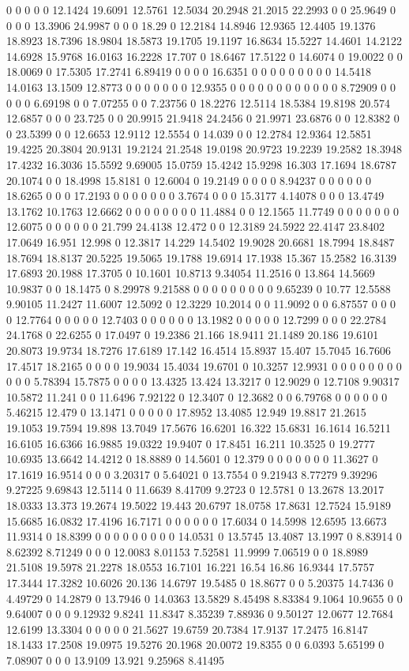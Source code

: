 0 0 0 0 0 12.1424 19.6091 12.5761 12.5034 20.2948 21.2015 22.2993 0 0 25.9649 0 0 0 0 13.3906 24.9987 0 0 0 18.29 0 12.2184 14.8946 12.9365 12.4405 19.1376 18.8923 18.7396 18.9804 18.5873 19.1705 19.1197 16.8634 15.5227 14.4601 14.2122 14.6928 15.9768 16.0163 16.2228 17.707 0 18.6467 17.5122 0 14.6074 0 19.0022 0 0 18.0069 0 17.5305 17.2741 6.89419 0 0 0 0 16.6351 0 0 0 0 0 0 0 0 0 14.5418 14.0163 13.1509 12.8773 0 0 0 0 0 0 0 12.9355 0 0 0 0 0 0 0 0 0 0 0 0 8.72909 0 0 0 0 0 6.69198 0 0 7.07255 0 0 7.23756 0 18.2276 12.5114 18.5384 19.8198 20.574 12.6857 0 0 0 23.725 0 0 20.9915 21.9418 24.2456 0 21.9971 23.6876 0 0 12.8382 0 0 23.5399 0 0 12.6653 12.9112 12.5554 0 14.039 0 0 12.2784 12.9364 12.5851 19.4225 20.3804 20.9131 19.2124 21.2548 19.0198 20.9723 19.2239 19.2582 18.3948 17.4232 16.3036 15.5592 9.69005 15.0759 15.4242 15.9298 16.303 17.1694 18.6787 20.1074 0 0 18.4998 15.8181 0 12.6004 0 19.2149 0 0 0 0 8.94237 0 0 0 0 0 0 18.6265 0 0 0 17.2193 0 0 0 0 0 0 0 3.7674 0 0 0 15.3177 4.14078 0 0 0 13.4749 13.1762 10.1763 12.6662 0 0 0 0 0 0 0 0 11.4884 0 0 12.1565 11.7749 0 0 0 0 0 0 0 12.6075 0 0 0 0 0 0 21.799 24.4138 12.472 0 0 12.3189 24.5922 22.4147 23.8402 17.0649 16.951 12.998 0 12.3817 14.229 14.5402 19.9028 20.6681 18.7994 18.8487 18.7694 18.8137 20.5225 19.5065 19.1788 19.6914 17.1938 15.367 15.2582 16.3139 17.6893 20.1988 17.3705 0 10.1601 10.8713 9.34054 11.2516 0 13.864 14.5669 10.9837 0 0 18.1475 0 8.29978 9.21588 0 0 0 0 0 0 0 0 0 9.65239 0 10.77 12.5588 9.90105 11.2427 11.6007 12.5092 0 12.3229 10.2014 0 0 11.9092 0 0 6.87557 0 0 0 0 12.7764 0 0 0 0 0 12.7403 0 0 0 0 0 0 13.1982 0 0 0 0 0 12.7299 0 0 0 22.2784 24.1768 0 22.6255 0 17.0497 0 19.2386 21.166 18.9411 21.1489 20.186 19.6101 20.8073 19.9734 18.7276 17.6189 17.142 16.4514 15.8937 15.407 15.7045 16.7606 17.4517 18.2165 0 0 0 0 19.9034 15.4034 19.6701 0 10.3257 12.9931 0 0 0 0 0 0 0 0 0 0 0 5.78394 15.7875 0 0 0 0 13.4325 13.424 13.3217 0 12.9029 0 12.7108 9.90317 10.5872 11.241 0 0 11.6496 7.92122 0 12.3407 0 12.3682 0 0 6.79768 0 0 0 0 0 0 5.46215 12.479 0 13.1471 0 0 0 0 0 17.8952 13.4085 12.949 19.8817 21.2615 19.1053 19.7594 19.898 13.7049 17.5676 16.6201 16.322 15.6831 16.1614 16.5211 16.6105 16.6366 16.9885 19.0322 19.9407 0 17.8451 16.211 10.3525 0 19.2777 10.6935 13.6642 14.4212 0 18.8889 0 14.5601 0 12.379 0 0 0 0 0 0 0 11.3627 0 17.1619 16.9514 0 0 0 3.20317 0 5.64021 0 13.7554 0 9.21943 8.77279 9.39296 9.27225 9.69843 12.5114 0 11.6639 8.41709 9.2723 0 12.5781 0 13.2678 13.2017 18.0333 13.373 19.2674 19.5022 19.443 20.6797 18.0758 17.8631 12.7524 15.9189 15.6685 16.0832 17.4196 16.7171 0 0 0 0 0 0 17.6034 0 14.5998 12.6595 13.6673 11.9314 0 18.8399 0 0 0 0 0 0 0 0 0 14.0531 0 13.5745 13.4087 13.1997 0 8.83914 0 8.62392 8.71249 0 0 0 12.0083 8.01153 7.52581 11.9999 7.06519 0 0 18.8989 21.5108 19.5978 21.2278 18.0553 16.7101 16.221 16.54 16.86 16.9344 17.5757 17.3444 17.3282 10.6026 20.136 14.6797 19.5485 0 18.8677 0 0 5.20375 14.7436 0 4.49729 0 14.2879 0 13.7946 0 14.0363 13.5829 8.45498 8.83384 9.1064 10.9655 0 0 9.64007 0 0 0 9.12932 9.8241 11.8347 8.35239 7.88936 0 9.50127 12.0677 12.7684 12.6199 13.3304 0 0 0 0 0 21.5627 19.6759 20.7384 17.9137 17.2475 16.8147 18.1433 17.2508 19.0975 19.5276 20.1968 20.0072 19.8355 0 0 6.0393 5.65199 0 7.08907 0 0 0 13.9109 13.921 9.25968 8.41495 